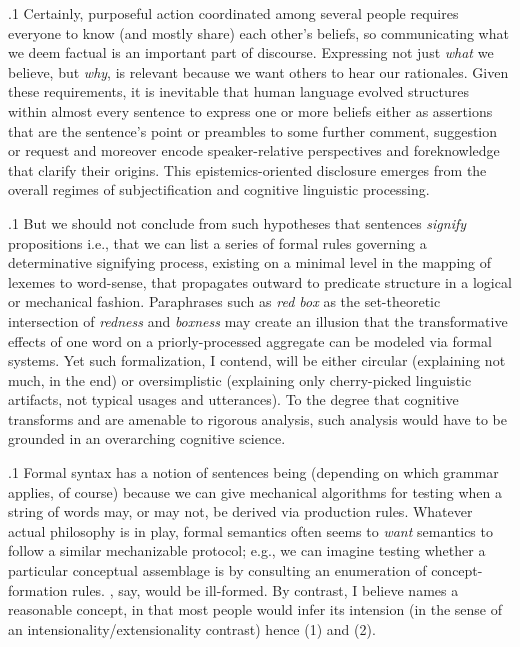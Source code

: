 \documentclass[11pt, twocolumn]{article}
\begin{document}
\p.1{%
\:\+Certainly, purposeful action coordinated among several people requires
everyone to know (and mostly share) each other's beliefs,
so communicating what we deem factual is an important part of
discourse. \> Expressing not just \textit{what} we believe, but \textit{why},
is relevant because we want others to hear our 
rationales. \> Given these requirements, it is inevitable that human
language evolved structures within almost every sentence
to express one or more beliefs \mdash{} either as assertions that
are the sentence's point or preambles to some further
comment, suggestion or request \mdash{} and moreover
encode speaker-relative perspectives and foreknowledge that
clarify their origins. \> This
epistemics-oriented \pgl{}disclosure
emerges from the overall regimes of subjectification and
cognitive linguistic processing.\<\;
} %

\p.1{%
\:\+But we should not conclude from such hypotheses that
sentences \textit{signify} propositions \mdash{} i.e., that
we can list a series of formal rules governing a determinative signifying process,
existing on a minimal level in the mapping of lexemes
to word-sense, that propagates outward to predicate
structure in a logical or mechanical fashion. \> Paraphrases 
such as \textit{red box} as the set-theoretic
intersection of \textit{redness} and \textit{boxness} may
create an illusion that the transformative
effects of one word on a priorly-processed aggregate
can be modeled via formal systems. \> Yet such
formalization, I contend, will be either circular
(explaining not much, in the end) or oversimplistic
(explaining only cherry-picked linguistic artifacts,
not typical usages and utterances). \> To the degree
that cognitive transforms and  are
amenable to rigorous analysis, such analysis
would have to be grounded in an overarching
cognitive science.\<\;
} %

\p.1{%
\:\+Formal syntax has a notion of sentences being 
(depending on which grammar applies, of course) because we can give
mechanical algorithms for testing when a string of words may, or may not,
be derived via production rules. \> Whatever actual philosophy is in play,
formal semantics often seems to \textit{want} semantics to follow a
similar mechanizable protocol; e.g., we can imagine testing whether a
particular conceptual assemblage is  by
consulting an enumeration of concept-formation 
rules. \> , say, would be ill-formed. \> By contrast,
I believe  names a reasonable concept, in
that most people would infer its intension (in the sense of an
intensionality/extensionality 
contrast) \mdash{} hence \exsRef(1) and \exsRef(2)\<\;.
} %
\end{document}
